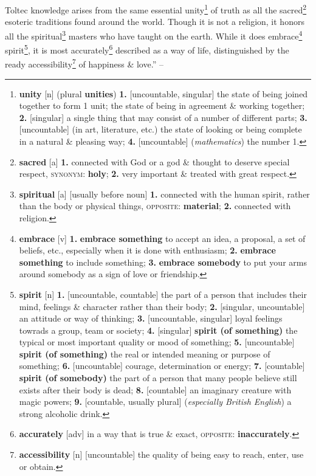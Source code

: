 \documentclass[oneside]{book}
\numberwithin{equation}{section}
\begin{document}
Toltec knowledge arises from the same essential unity\footnote{\textbf{unity} [n] (plural \textbf{unities}) \textbf{1.} [uncountable, singular] the state of being joined together to form 1 unit; the state of being in agreement \& working together; \textbf{2.} [singular] a single thing that may consist of a number of different parts; \textbf{3.} [uncountable] (in art, literature, etc.) the state of looking or being complete in a natural \& pleasing way; \textbf{4.} [uncountable] (\textit{mathematics}) the number 1.} of truth as all the sacred\footnote{\textbf{sacred} [a] \textbf{1.} connected with God or a god \& thought to deserve special respect, \textsc{synonym}: \textbf{holy}; \textbf{2.} very important \& treated with great respect.} esoteric traditions found around the world. Though it is not a religion, it honors all the spiritual\footnote{\textbf{spiritual} [a] [usually before noun] \textbf{1.} connected with the human spirit, rather than the body or physical things, \textsc{opposite}: \textbf{material}; \textbf{2.} connected with religion.} masters who have taught on the earth. While it does embrace\footnote{\textbf{embrace} [v] \textbf{1.} \textbf{embrace something} to accept an idea, a proposal, a set of beliefs, etc., especially when it is done with enthusiasm; \textbf{2.} \textbf{embrace something} to include something; \textbf{3.} \textbf{embrace somebody} to put your arms around somebody as a sign of love or friendship.} spirit\footnote{\textbf{spirit} [n] \textbf{1.} [uncountable, countable] the part of a person that includes their mind, feelings \& character rather than their body; \textbf{2.} [singular, uncountable] an attitude or way of thinking; \textbf{3.} [uncountable, singular] loyal feelings towrads a group, team or society; \textbf{4.} [singular] \textbf{spirit (of something)} the typical or most important quality or mood of something; \textbf{5.} [uncountable] \textbf{spirit (of something)} the real or intended meaning or purpose of something; \textbf{6.} [uncountable] courage, determination or energy; \textbf{7.} [countable] \textbf{spirit (of somebody)} the part of a person that many people believe still exists after their body is dead; \textbf{8.} [countable] an imaginary creature with magic powers; \textbf{9.} [countable, usually plural] (\textit{especially British English}) a strong alcoholic drink.}, it is most accurately\footnote{\textbf{accurately} [adv] in a way that is true \& exact, \textsc{opposite}: \textbf{inaccurately}.} described as a way of life, distinguished by the ready accessibility\footnote{\textbf{accessibility} [n] [uncountable] the quality of being easy to reach, enter, use or obtain.} of happiness \& love.'' -- \cite[The Toltec]{Ruiz2011}
\end{document}
